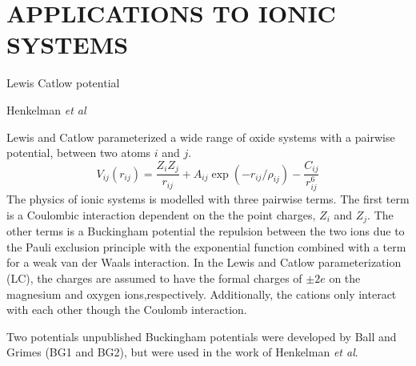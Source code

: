 \chapter{APPLICATIONS TO IONIC SYSTEMS}

Lewis Catlow potential\cite{lewis1985_buckingham}

Henkelman \emph{et al}\cite{henkelman2005_buckingham_MgO}

Lewis and Catlow\cite{lewis1985_buckingham} parameterized a wide range of oxide systems with a pairwise potential, between two atoms $i$ and $j$.
\begin{equation}
  V_{ij}(r_{ij})=\frac{Z_i Z_j}{r_{ij}}+A_{ij}\exp(-r_{ij}/\rho_{ij})-\frac{C_{ij}}{r_{ij}^6}
\end{equation}
The physics of ionic systems is modelled with three pairwise terms.
The first term is a Coulombic interaction dependent on the the point charges, $Z_i$ and $Z_j$.
The other terms is a Buckingham potential the repulsion between the two ions due to the Pauli exclusion principle with the exponential function combined with a term for a weak van der Waals interaction.
In the Lewis and Catlow parameterization (LC), the charges are assumed to have the formal charges of $\pm 2e$ on the magnesium and oxygen ions,respectively.
Additionally, the cations only interact with each other though the Coulomb interaction.

Two potentials unpublished Buckingham potentials were developed by Ball and Grimes (BG1 and BG2), but were used in the work of Henkelman \emph{et al}\cite{henkelman2005_buckingham_MgO}.
